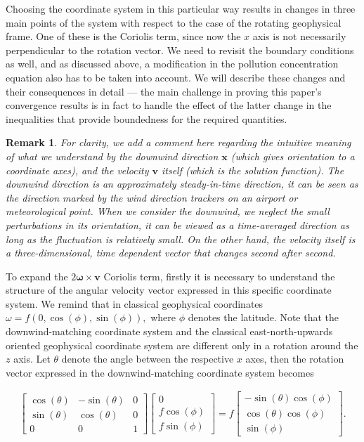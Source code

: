 \documentclass[11pt]{article}
\newtheorem{remark}{Remark}
\begin{document}
Choosing the coordinate system in this particular way results in changes in three main points of the system with respect to the case of the rotating geophysical frame. One of these is the Coriolis term, since now the $x$ axis is not necessarily perpendicular to the rotation vector. We need to revisit the boundary conditions as well, and as discussed above, a modification in the pollution concentration equation also has to be taken into account. We will describe these changes and their consequences in detail --- the main challenge in proving this paper's convergence results is in fact to handle the effect of the latter change in the inequalities that provide boundedness for the required quantities.

\begin{remark} \normalfont
For clarity, we add a comment here regarding the intuitive meaning of what we understand by the downwind direction $\mathbf{x}$ (which gives orientation to a coordinate axes), and the velocity $\mathbf{v}$ itself (which is the solution function). The downwind direction is an approximately steady-in-time direction, it can be seen as the direction marked by the wind direction trackers on an airport or meteorological point. When we consider the downwind, we neglect the small perturbations in its orientation, it can be viewed as a time-averaged direction as long as the fluctuation is relatively small. On the other hand, the velocity itself is a three-dimensional, time dependent vector that changes second after second.
\end{remark}

To expand the $2 \mathbf{\omega} \times \mathbf{v}$ Coriolis term, firstly it is necessary to understand the structure of the angular velocity vector expressed in this specific coordinate system. We remind that in classical geophysical coordinates $\omega = f (0, \cos(\phi), \sin(\phi)),$ where $\phi$ denotes the latitude. Note that the downwind-matching coordinate system and the classical east-north-upwards oriented geophysical coordinate system are different only in a rotation around the $z$ axis. Let $\theta$ denote the angle between the respective $x$ axes, then the rotation vector expressed in the downwind-matching coordinate system becomes

\begin{gather}
\begin{bmatrix} \cos(\theta) & -\sin(\theta) & 0 \\ \sin(\theta) & \cos(\theta) & 0 \\ 0 & 0 & 1 \end{bmatrix} \begin{bmatrix} 0 \\ f \cos(\phi) \\ f \sin(\phi) \end{bmatrix}
=
f \begin{bmatrix} -\sin(\theta)\cos(\phi) \\ \cos(\theta) \cos(\phi) \\ \sin(\phi) \end{bmatrix}.
\end{gather}
\end{document}
